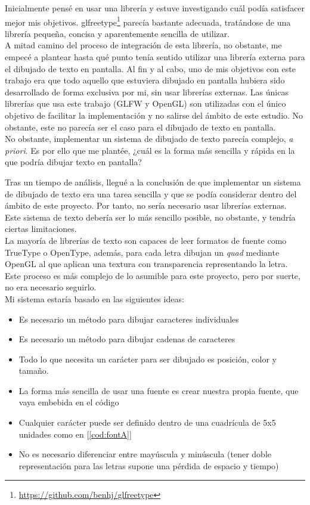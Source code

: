 Inicialmente pensé en usar una librería y estuve investigando cuál podía satisfacer mejor mis objetivos. glfreetype\footnote{\url{https://github.com/benhj/glfreetype}} parecía bastante adecuada, tratándose de una librería pequeña, concisa y aparentemente sencilla de utilizar.\\

A mitad camino del proceso de integración de esta librería, no obstante, me empecé a plantear hasta qué punto tenía sentido utilizar una librería externa para el dibujado de texto en pantalla. Al fin y al cabo, uno de mis objetivos con este trabajo era que todo aquello que estuviera dibujado en pantalla hubiera sido desarrollado de forma exclusiva por mi, sin usar librerías externas. Las únicas librerías que usa este trabajo (GLFW y OpenGL) son utilizadas con el único objetivo de facilitar la implementación y no salirse del ámbito de este estudio. No obstante, este no parecía ser el caso para el dibujado de texto en pantalla.\\

No obstante, implementar un sistema de dibujado de texto parecía complejo, \emph{a priori}. Es por ello que me plantée, ¿cuál es la forma más sencilla y rápida en la que podría dibujar texto en pantalla?

Tras un tiempo de análisis, llegué a la conclusión de que implementar un sistema de dibujado de texto era una tarea sencilla y que se podía considerar dentro del ámbito de este proyecto. Por tanto, no sería necesario usar librerías externas. Este sistema de texto debería ser lo más sencillo posible, no obstante, y tendría ciertas limitaciones.\\

La mayoría de librerías de texto son capaces de leer formatos de fuente como TrueType o OpenType, además, para cada letra dibujan un \emph{quad} mediante OpenGL al que aplican una textura con transparencia representando la letra. Este proceso es más complejo de lo asumible para este proyecto, pero por suerte, no era necesario seguirlo.\\

Mi sistema estaría basado en las siguientes ideas: 
\begin{itemize}
	\item Es necesario un método para dibujar caracteres individuales
	\item Es necesario un método para dibujar cadenas de caracteres
	\item Todo lo que necesita un carácter para ser dibujado es posición, color y tamaño.
	\item La forma más sencilla de usar una fuente es crear nuestra propia fuente, que vaya embebida en el código
	\item Cualquier carácter puede ser definido dentro de una cuadrícula de 5x5 unidades como en [\ref{cod:fontA}]
	\item No es necesario diferenciar entre mayúscula y minúscula (tener doble representación para las letras supone una pérdida de espacio y tiempo)
\end{itemize}

